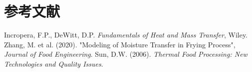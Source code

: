 \documentclass[12pt]{article}
\begin{document}
\section*{参考文献}
\begin{thebibliography}{99}
 Incropera, F.P., DeWitt, D.P. \emph{Fundamentals of Heat and Mass Transfer}, Wiley.
 Zhang, M. et al. (2020). "Modeling of Moisture Transfer in Frying Process", \emph{Journal of Food Engineering}.
 Sun, D.W. (2006). \emph{Thermal Food Processing: New Technologies and Quality Issues}.
\end{thebibliography}
\end{document}
